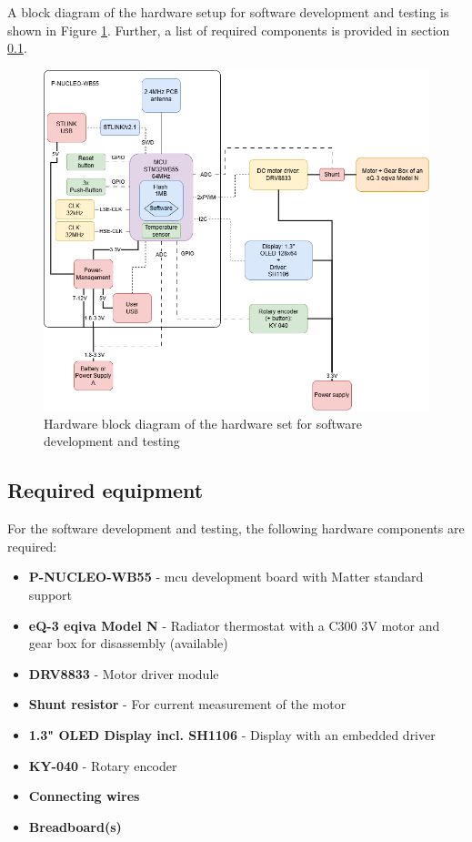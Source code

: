 A block diagram of the hardware setup for software development and testing is shown in Figure \ref{fig:mt-rt-sw-dev-hw-block-diagram}. Further, a list of required components is provided in section \ref{sec:Required equipment}.

\begin{figure}[htbp]
    \centering
    \includegraphics[width=1.0\textwidth]{../../electronics/mt-rt-sw-dev-hw-block-diagram.png}
    \caption{Hardware block diagram of the hardware set for software development and testing}
    \label{fig:mt-rt-sw-dev-hw-block-diagram}
\end{figure}

\subsection{Required equipment}
\label{sec:Required equipment}

For the software development and testing, the following hardware components are required:

\begin{itemize}
    \item \textbf{P-NUCLEO-WB55} - \acs{mcu} development board with Matter standard support
    \item \textbf{eQ-3 eqiva Model N} - Radiator thermostat with a C300 3V motor and gear box for disassembly (available)
    \item \textbf{DRV8833} - Motor driver module
    \item \textbf{Shunt resistor} - For current measurement of the motor
    \item \textbf{1.3" OLED Display incl. SH1106} - Display with an embedded driver
    \item \textbf{KY-040} - Rotary encoder
    \item \textbf{Connecting wires}
    \item \textbf{Breadboard(s)}
\end{itemize}

